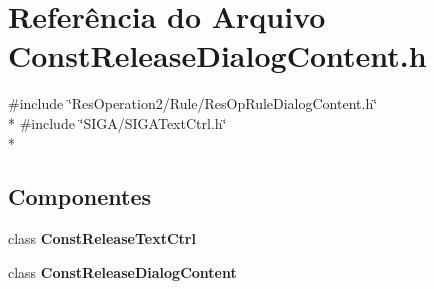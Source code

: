 \section{Referência do Arquivo Const\+Release\+Dialog\+Content.\+h}
\label{_2_rule_2_const_release_2_const_release_dialog_content_8h}
{\ttfamily \#include \char`\"{}Res\+Operation2/\+Rule/\+Res\+Op\+Rule\+Dialog\+Content.\+h\char`\"{}}\\*
{\ttfamily \#include \char`\"{}S\+I\+G\+A/\+S\+I\+G\+A\+Text\+Ctrl.\+h\char`\"{}}\\*
\subsection*{Componentes}
\begin{DoxyCompactItemize}
\item 
class {\bf Const\+Release\+Text\+Ctrl}
\item 
class {\bf Const\+Release\+Dialog\+Content}
\end{DoxyCompactItemize}
